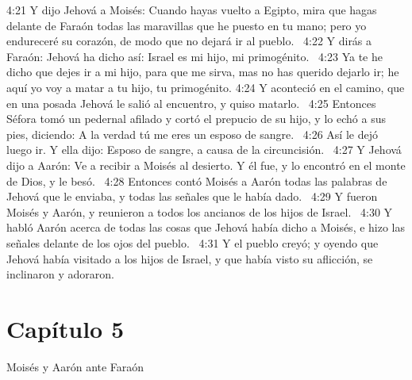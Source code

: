 4:21 Y dijo Jehová a Moisés: Cuando hayas vuelto a Egipto, mira que hagas delante de Faraón todas las maravillas que he puesto en tu mano; pero yo endureceré su corazón, de modo que no dejará ir al pueblo.  
4:22 Y dirás a Faraón: Jehová ha dicho así: Israel es mi hijo, mi primogénito.  
4:23 Ya te he dicho que dejes ir a mi hijo, para que me sirva, mas no has querido dejarlo ir; he aquí yo voy a matar a tu hijo, tu primogénito. 
4:24 Y aconteció en el camino, que en una posada Jehová le salió al encuentro, y quiso matarlo.  
4:25 Entonces Séfora tomó un pedernal afilado y cortó el prepucio de su hijo, y lo echó a sus pies, diciendo: A la verdad tú me eres un esposo de sangre.  
4:26 Así le dejó luego ir. Y ella dijo: Esposo de sangre, a causa de la circuncisión.  
4:27 Y Jehová dijo a Aarón: Ve a recibir a Moisés al desierto. Y él fue, y lo encontró en el monte de Dios, y le besó.  
4:28 Entonces contó Moisés a Aarón todas las palabras de Jehová que le enviaba, y todas las señales que le había dado.  
4:29 Y fueron Moisés y Aarón, y reunieron a todos los ancianos de los hijos de Israel.  
4:30 Y habló Aarón acerca de todas las cosas que Jehová había dicho a Moisés, e hizo las señales delante de los ojos del pueblo.  
4:31 Y el pueblo creyó; y oyendo que Jehová había visitado a los hijos de Israel, y que había visto su aflicción, se inclinaron y adoraron.  
\section*{Capítulo 5}
Moisés y Aarón ante Faraón  

